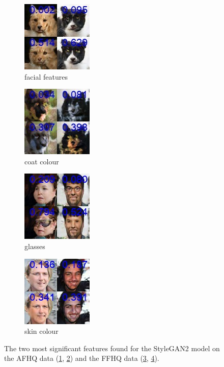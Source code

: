 \begin{figure}[H]
     \centering
     \begin{subfigure}[b]{0.24\textwidth}
     \centering
     \includegraphics[scale=0.6]{images/stygan2_afhq_eyes.png}
     \caption{facial features}
     \label{fig:eyes_gan2}
     \end{subfigure}
     \hfill
     \begin{subfigure}[b]{0.24\textwidth}
     \centering
     \includegraphics[scale=0.6]{images/stylegan2_afhq_color.png}
     \caption{coat colour}
     \label{fig:coat_color_gan2}
     \end{subfigure}
     \hfill
     \begin{subfigure}[b]{0.24\textwidth}
     \centering
     \includegraphics[scale=0.6]{images/stylegan2_ffhq_glasses.jpeg}
     \caption{glasses}
     \label{fig:glasses_gan2}
     \end{subfigure}
     \hfill
     \begin{subfigure}[b]{0.24\textwidth}
     \centering
     \includegraphics[scale=0.6]{images/stylegan2_ffhq_skincolour.jpeg}
     \caption{skin colour}
     \label{fig:skincolour_gan2}
     \end{subfigure}
     \hfill
     \caption{The two most significant features found for the StyleGAN2 model on the AFHQ data (\ref{fig:eyes_gan2}, \ref{fig:coat_color_gan2}) and the FFHQ data (\ref{fig:glasses_gan2}, \ref{fig:skincolour_gan2}).}
     \label{fig:Flip}
\end{figure}


